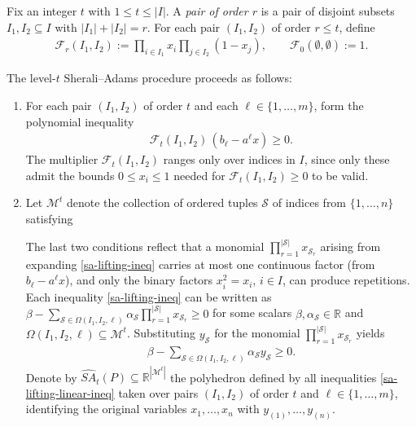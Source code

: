 \documentclass{article}
\newcommand{\R}{\mathbb{R}}
\newcommand{\F}{\mathcal{F}}
\newcommand{\M}{\mathcal{M}}
\renewcommand{\S}{\mathcal{S}}
\begin{document}
 Fix an integer $t$ with $1 \leq t \leq |I|$. A \emph{pair of order $r$} is a pair of disjoint subsets $I_1, I_2 \subseteq I$ with $|I_1|+|I_2| = r$. For each pair $(I_1, I_2)$ of order $r \leq t$, define
\begin{align}
    \F_r(I_1, I_2) := \prod_{i \in I_1} x_i \prod_{j \in I_2} (1 - x_j),
    \qquad \F_0(\emptyset,\emptyset) := 1.
\end{align}

The level-$t$ Sherali--Adams procedure proceeds as follows:
\begin{enumerate}
    \item For each pair $(I_1, I_2)$ of order $t$ and each $\ell \in \{1,\ldots,m\}$, form the polynomial inequality
    \begin{align}
        \F_t(I_1, I_2)\,(b_\ell - {a^\ell} x) \geq 0. \label{sa-lifting-ineq}
    \end{align}
    The multiplier $\F_t(I_1, I_2)$ ranges only over indices in $I$, since only these admit the bounds $0 \leq x_i \leq 1$ needed for $\F_t(I_1, I_2) \geq 0$ to be valid.

    \item Let $\M^t$ denote the collection of ordered tuples $\S$ of indices from $\{1,\dots,n\}$ satisfying
    The last two conditions reflect that a monomial $\prod_{r=1}^{|\S|} x_{\S_r}$ arising from expanding \eqref{sa-lifting-ineq} carries at most one continuous factor (from $b_\ell - {a^\ell} x$), and only the binary factors $x_i^2 = x_i$, $i \in I$, can produce repetitions. Each inequality \eqref{sa-lifting-ineq} can be written as $\beta - \sum_{\S \in \Omega(I_1, I_2,\ell)} \alpha_\S \prod_{r=1}^{|\S|} x_{\S_r} \geq 0$ for some scalars $\beta, \alpha_\S \in \R$ and $\Omega(I_1, I_2, \ell) \subseteq \M^t$. Substituting $y_\S$ for the monomial $\prod_{r=1}^{|\S|} x_{\S_r}$ yields
    \begin{align}
        \beta - \sum_{\S \in \Omega(I_1, I_2, \ell)} \alpha_\S y_\S \geq 0. \label{sa-lifting-linear-ineq}
    \end{align}
    Denote by $\widehat{SA}_t(P) \subseteq \R^{|\M^t|}$ the polyhedron defined by all inequalities \eqref{sa-lifting-linear-ineq} taken over pairs $(I_1, I_2)$ of order $t$ and $\ell \in \{1,\ldots,m\}$, identifying the original variables $x_1,\ldots,x_n$ with $y_{(1)},\ldots,y_{(n)}$.


\end{enumerate}
\end{document}
